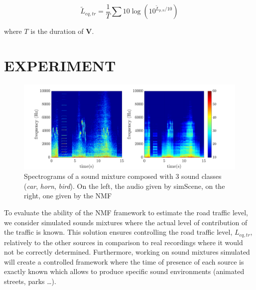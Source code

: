 \documentclass{article}
\begin{document}
\begin{sloppy}
\begin{equation}\label{eq:Leq}
\tilde{L}_{eq,tr} = \frac{1}{T} \sum 10\log \left(10^{\tilde{L}_{p,n}/10}\right)
\end{equation}

where $T$ is the duration of $\mathbf{V}$.\\



\section{EXPERIMENT}\label{sec:experiment}

\begin{figure}[th!]
\centering
\includegraphics[width=\textwidth]{images/bvak_Sc2_Vapprox_spectre_Euc.pdf}
\caption{Spectrograms of a sound mixture composed with 3 sound classes (\textit{car}, \textit{horn}, \textit{bird}). On the left, the audio given by simScene, on the right, one given by the NMF}
\label{fig:spectrogram}
\end{figure}

To evaluate the ability of the NMF framework to estimate the road traffic level, we consider simulated sounds mixtures where the actual level of contribution of the traffic is known. This solution ensures controlling the road traffic level, $L_{eq,tr}$, relatively to the other sources in comparison to real recordings where it would not be correctly determined. Furthermore, working on sound mixtures simulated will create a controlled framework where the time of presence of each source is exactly known which allows to produce specific sound environments (animated streets, parks \dots). 


\end{sloppy}
\end{document}

